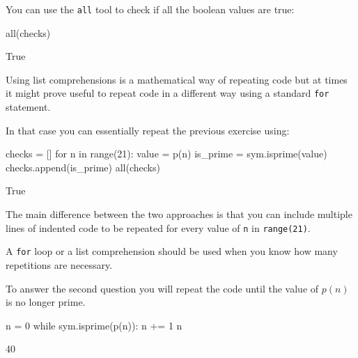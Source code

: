 You can use the \texttt{all} tool to check if all the boolean values are true:




\begin{pyin}
all(checks)
\end{pyin}





\begin{raw}
True
\end{raw}

\begin{note}
Using list comprehensions is a mathematical way of repeating code but at times
it might prove useful to repeat code in a different way using a standard \texttt{for}
statement.
\end{note}



In that case you can essentially repeat the previous exercise using:

\begin{pyin}
checks = []
for n in range(21):
    value = p(n)
    is_prime = sym.isprime(value)
    checks.append(is_prime)
all(checks)
\end{pyin}





\begin{raw}
True
\end{raw}





The main difference between the two approaches is that you can include multiple
lines of indented code to be repeated for every value of \texttt{n} in
\texttt{range(21)}.


\begin{note}
A \texttt{for} loop or a list comprehension should be used when you know how many
repetitions are necessary.
\end{note}



To answer the second question you will repeat the code until the value of \(p(n)\)
is no longer prime.




\begin{pyin}
n = 0
while sym.isprime(p(n)):
    n += 1
n
\end{pyin}





\begin{raw}
40
\end{raw}



